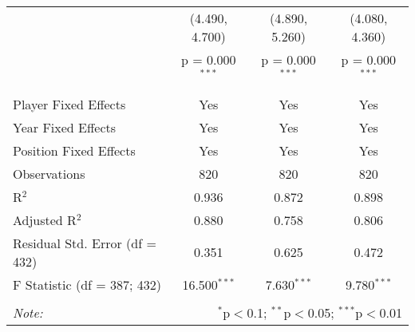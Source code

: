 \documentclass[12pt]{article}
\begin{document}
\begin{sidewaystable}[!htbp]
\begin{tabular}{@{\extracolsep{5pt}}lccc}
			& (4.490, 4.700) & (4.890, 5.260) & (4.080, 4.360) \\ 
			& p = 0.000$^{***}$ & p = 0.000$^{***}$ & p = 0.000$^{***}$ \\ 
			& & & \\ 
			\hline \\[-1.8ex] 
			Player Fixed Effects & Yes & Yes & Yes \\ 
			Year Fixed Effects & Yes & Yes & Yes \\ 
			Position Fixed Effects & Yes & Yes & Yes \\ 
			Observations & 820 & 820 & 820 \\ 
			R$^{2}$ & 0.936 & 0.872 & 0.898 \\ 
			Adjusted R$^{2}$ & 0.880 & 0.758 & 0.806 \\ 
			Residual Std. Error (df = 432) & 0.351 & 0.625 & 0.472 \\ 
			F Statistic (df = 387; 432) & 16.500$^{***}$ & 7.630$^{***}$ & 9.780$^{***}$ \\ 
			\hline 
			\hline \\[-1.8ex] 
			\textit{Note:}  & \multicolumn{3}{r}{$^{*}$p$<$0.1; $^{**}$p$<$0.05; $^{***}$p$<$0.01} \\ 
		\end{tabular} 
	\end{sidewaystable} 
\end{document}
